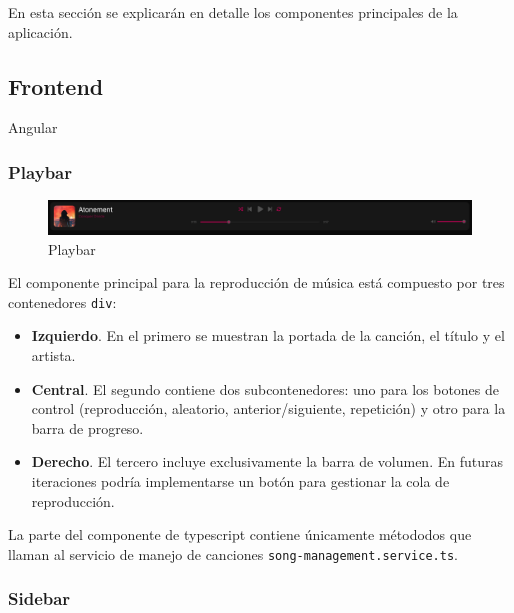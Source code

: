 \documentclass[11pt, a4paper]{article}
\begin{document}
En esta sección se explicarán en detalle los componentes principales de la aplicación.

        \subsection{Frontend}

        Angular

            \subsubsection{Playbar}

            \begin{figure}[H]
                \centering
                \includegraphics[width=1\textwidth]{media/screenshots/playbar.png}
                \caption{Playbar}
                \label{fig:playbar}
            \end{figure}

            El componente principal para la reproducción de música está compuesto por tres contenedores \texttt{div}:

            \begin{itemize}
                \item \textbf{Izquierdo}. En el primero se muestran la portada de la canción, el título y el artista.
                \item \textbf{Central}. El segundo contiene dos subcontenedores: uno para los botones de control (reproducción, aleatorio, anterior/siguiente, repetición) y otro para la barra de progreso.
                \item \textbf{Derecho}. El tercero incluye exclusivamente la barra de volumen. En futuras iteraciones podría implementarse un botón para gestionar la cola de reproducción.
            \end{itemize}

            La parte del componente de typescript contiene únicamente métododos que llaman al servicio de manejo de canciones \texttt{song-management.service.ts}.

            \subsubsection{Sidebar}
\end{document}
